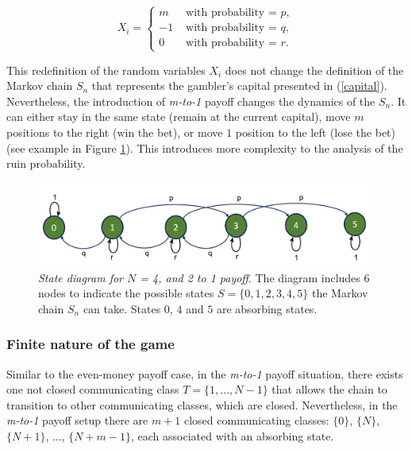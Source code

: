 \documentclass[11pt,twoside]{article}
\numberwithin{Theorem}{section}
\numberwithin{Definition}{section}
\numberwithin{Lemma}{section}
\numberwithin{Algorithm}{section}
\numberwithin{equation}{section}
\begin{document}
\begin{equation}
X_{i} = \left\{
\begin{array}{rl}
m & \text{ with probability = } p,\\
-1 & \text{ with probability = } q,\\
0 & \text{ with probability = } r.
\end{array}
\right.
\end{equation}\label{x_i_ext}

This redefinition of the random variables $X_{i}$ does not change the definition of the Markov chain $S_{n}$ that represents the gambler's capital presented in (\ref{capital}). Nevertheless, the introduction of \textit{m-to-1} payoff changes the dynamics of the $S_{n}$. It can either stay in the same state (remain at the current capital), move $m$ positions to the right (win the bet), or move $1$ position to the left (lose the bet) (see example in Figure \ref{fig:diagram_2}). This introduces more complexity to the analysis of the ruin probability.

\begin{figure}[ht]
        \centering
        \includegraphics[width=12cm]{diagram_2.png}
        \caption[Markov chain state diagram \textit{m-to-1} payoff case.] {\textit{State diagram for $N$ = 4, and 2 to 1 payoff}. The diagram includes 6 nodes to indicate the possible states $S = \{0,1,2,3,4,5\}$ the Markov chain $S_{n}$ can take. States $0$, $4$ and $5$ are absorbing states.} \label{fig:diagram_2}
\end{figure}

\subsubsection{Finite nature of the game}
Similar to the even-money payoff case, in the \textit{m-to-1} payoff situation, there exists one not closed communicating class $T = \{1,...,N-1\}$ that allows the chain to transition to other communicating classes, which are closed. Nevertheless, in the \textit{m-to-1} payoff setup there are  $m+1$ closed communicating classes: $\{0\}$, $\{N\}$, $\{N+1\}$, ..., $\{N+m-1\}$, each associated with an absorbing state.
\end{document}
